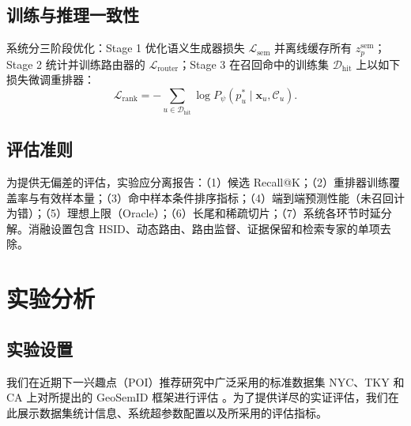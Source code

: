 \documentclass[10pt,fontset=none,twocolumn]{ctexart}
\newcommand{\HitTrain}{\mathcal{D}_{\mathrm{hit}}}
\begin{document}
\subsection{训练与推理一致性}
\label{subsec:training}

系统分三阶段优化：Stage 1 优化语义生成器损失 $\mathcal{L}_{\mathrm{sem}}$ 并离线缓存所有 $z_p^{\mathrm{sem}}$；Stage 2 统计并训练路由器的 $\mathcal{L}_{\mathrm{router}}$；Stage 3 在召回命中的训练集 $\HitTrain$ 上以如下损失微调重排器：
\begin{equation}
\mathcal{L}_{\mathrm{rank}}
=
-
\sum_{u\in\HitTrain}
\log
P_{\psi}(p_u^{*}\mid\bm{x}_u,\mathcal{C}_u).
\label{eq:rank_loss}
\end{equation}

\subsection{评估准则}
\label{subsec:evaluation_contract}

为提供无偏差的评估，实验应分离报告：（1）候选 Recall@K；（2）重排器训练覆盖率与有效样本量；（3）命中样本条件排序指标；（4）端到端预测性能（未召回计为错）；（5）理想上限（Oracle）；（6）长尾和稀疏切片；（7）系统各环节时延分解。消融设置包含 HSID、动态路由、路由监督、证据保留和检索专家的单项去除。

\section{实验分析}
\label{sec:experiments}

\subsection{实验设置}
我们在近期下一兴趣点（POI）推荐研究中广泛采用的标准数据集 NYC、TKY 和 CA 上对所提出的 GeoSemID 框架进行评估 \cite{zhong2025}。为了提供详尽的实证评估，我们在此展示数据集统计信息、系统超参数配置以及所采用的评估指标。

\begin{table}[!h]
\centering
\caption{NYC、TKY 和 CA 数据集统计信息}
\label{tab:dataset_statistics}
\end{table}
\end{document}

